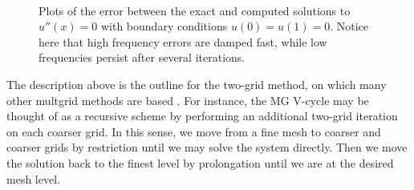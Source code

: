 \begin{figure}
	\centering
	\\
	\caption{Plots of the error between the exact and computed solutions to $u''(x)=0$ with boundary conditions $u(0)=u(1)=0$.
			 Notice here that high frequency errors are damped fast, while low frequencies persist after several iterations.}
\end{figure}

The description above is the outline for the two-grid method, on which many other multgrid methods are based \cite{hackbusch}.
For instance, the MG V-cycle may be thought of as a recursive scheme by performing an additional two-grid iteration on each coarser grid.
In this sense, we move from a fine mesh to coarser and coarser grids by restriction until we may solve the system directly.
Then we move the solution back to the finest level by prolongation until we are at the desired mesh level. 

